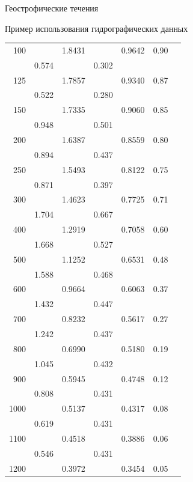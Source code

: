 \begin{chapter}{Геострофические течения}
\begin{section}{Пример использования гидрографических данных}
\begin{table}[t!]
\begin{center}
\begin{small}
\begin{tabular}{rrrrrrl}
100&               &    1.8431&        &    0.9642& 0.90\\
 &      0.574  &       & 0.302              \\
125&            &   1.7857&        &    0.9340& 0.87\\
 &      0.522  &       & 0.280              \\
150&               &    1.7335&        &    0.9060& 0.85\\
 &      0.948  &       & 0.501              \\
200&               &    1.6387&        &    0.8559& 0.80\\
 &      0.894  &       & 0.437              \\
250&            &   1.5493&        &    0.8122& 0.75\\
 &      0.871  &       & 0.397              \\
300&               &    1.4623&        &    0.7725& 0.71\\
 &      1.704  &       & 0.667              \\
400&               &    1.2919&        &    0.7058& 0.60\\
 &      1.668  &       & 0.527              \\
500&               &    1.1252&        &    0.6531& 0.48\\
 &      1.588  &       & 0.468              \\
600&               &    0.9664&        &    0.6063& 0.37\\
 &      1.432  &       & 0.447              \\
700&               &    0.8232&        &    0.5617& 0.27\\
 &      1.242  &       & 0.437              \\
800&               &    0.6990&        &    0.5180& 0.19\\
 &      1.045  &       & 0.432              \\
900&               &    0.5945&        &    0.4748& 0.12\\
 &      0.808  &       & 0.431              \\
1000&             & 0.5137&        &    0.4317& 0.08\\
 &      0.619  &       & 0.431              \\
1100&             & 0.4518&        &    0.3886& 0.06\\
 &      0.546  &       & 0.431              \\
1200&             & 0.3972&        &    0.3454& 0.05\\

\end{tabular}
\end{small}
\end{center}
\end{table}
\end{section}
\end{chapter}
